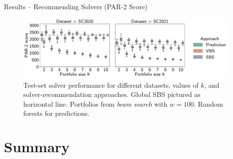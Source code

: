 \documentclass[en]{sdqbeamer}
\begin{document}
\begin{frame}[t]{Results -- Recommending Solvers (PAR-2 Score)}
	\begin{figure}[htb]
		\centering
		\includegraphics[width=\textwidth]{plots/prediction-test-objective-beam.pdf}
		\caption*{Test-set solver performance for different datasets, values of $k$, and solver-recommendation approaches. Global SBS pictured as horizontal line. Portfolios from \emph{beam search} with $w=100$. Random forests for predictions.}
	\end{figure}
\end{frame}

\section{Summary}
\end{document}
